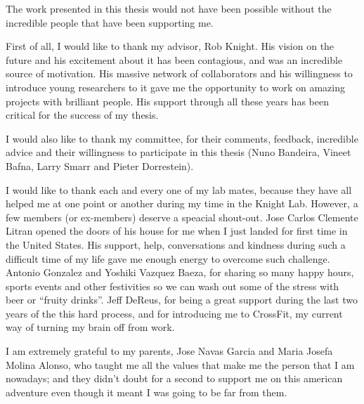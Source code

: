 \begin{frontmatter}
\printglossary[title=List of Abbreviations,toctitle=List of Abbreviations,nonumberlist ]
\listoffigures  %
\listoftables   %

%
%
\begin{acknowledgements}
    The work presented in this thesis would not have been possible without
    the incredible people that have been supporting me.

    First of all, I would like to thank my advisor, Rob Knight. His vision on
    the future and his excitement about it has been contagious, and was an
    incredible source of motivation. His massive network of collaborators and his
    willingness to introduce young researchers to it gave me the opportunity to
    work on amazing projects with brilliant people. His support through all these
    years has been critical for the success of my thesis.

    I would also like to thank my committee, for their comments, feedback, incredible
    advice and their willingness to participate in this thesis (Nuno Bandeira,
    Vineet Bafna, Larry Smarr and Pieter Dorrestein).

    I would like to thank each and every one of my lab mates, because they have
    all helped me at one point or another during my time in the Knight Lab. However,
    a few members (or ex-members) deserve a speacial shout-out. Jose Carlos
    Clemente Litran opened the doors of his house for me when I just landed for
    first time in the United States. His support, help, conversations and kindness
    during such a difficult time of my life gave me enough energy to
    overcome such challenge. Antonio Gonzalez and Yoshiki Vazquez Baeza, for
    sharing so many happy hours, sports events and other festivities so we can wash
    out some of the stress with beer or ``fruity drinks''. Jeff DeReus, for being
    a great support during the last two years of the this hard process, and for
    introducing me to CrossFit, my current way of turning my brain off from work.

    I am extremely grateful to my parents, Jose Navas Garcia and Maria Josefa
    Molina Alonso, who taught me all the values that make me the person that
    I am nowadays; and they didn't doubt for a second to support me on this
    american adventure even though it meant I was going to be far from them.


\end{acknowledgements}
\end{frontmatter}
